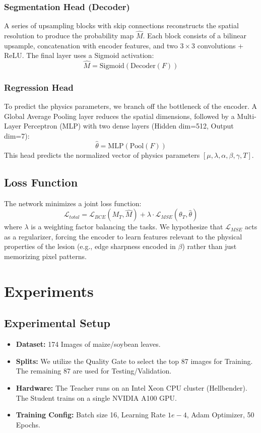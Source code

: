 \documentclass[journal]{IEEEtran}
\begin{document}
\subsubsection{Segmentation Head (Decoder)}
A series of upsampling blocks with skip connections reconstructs the spatial resolution to produce the probability map $\hat{M}$. Each block consists of a bilinear upsample, concatenation with encoder features, and two $3 \times 3$ convolutions + ReLU. The final layer uses a Sigmoid activation:
\begin{equation}
\hat{M} = \text{Sigmoid}(\text{Decoder}(F))
\end{equation}

\subsubsection{Regression Head}
To predict the physics parameters, we branch off the bottleneck of the encoder. A Global Average Pooling layer reduces the spatial dimensions, followed by a Multi-Layer Perceptron (MLP) with two dense layers (Hidden dim=512, Output dim=7):
\begin{equation}
\hat{\theta} = \text{MLP}(\text{Pool}(F))
\end{equation}
This head predicts the normalized vector of physics parameters $[\mu, \lambda, \alpha, \beta, \gamma, T]$.

\subsection{Loss Function}
The network minimizes a joint loss function:
\begin{equation}
\mathcal{L}_{total} = \mathcal{L}_{BCE}(M_T, \hat{M}) + \lambda \cdot \mathcal{L}_{MSE}(\theta_T, \hat{\theta})
\end{equation}
where $\lambda$ is a weighting factor balancing the tasks. We hypothesize that $\mathcal{L}_{MSE}$ acts as a regularizer, forcing the encoder to learn features relevant to the physical properties of the lesion (e.g., edge sharpness encoded in $\beta$) rather than just memorizing pixel patterns.

\section{Experiments}

\subsection{Experimental Setup}
\begin{itemize}
    \item \textbf{Dataset:} 174 Images of maize/soybean leaves.
    \item \textbf{Splits:} We utilize the Quality Gate to select the top 87 images for Training. The remaining 87 are used for Testing/Validation.
    \item \textbf{Hardware:} The Teacher runs on an Intel Xeon CPU cluster (Hellbender). The Student trains on a single NVIDIA A100 GPU.
    \item \textbf{Training Config:} Batch size 16, Learning Rate $1e-4$, Adam Optimizer, 50 Epochs.
\end{itemize}
\end{document}
